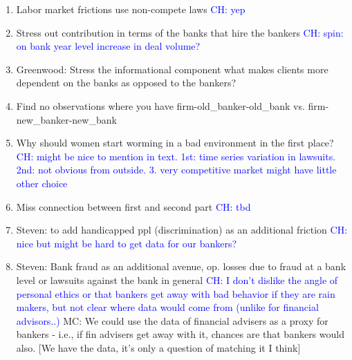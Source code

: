 \begin{enumerate}
	\item Labor market frictions use non-compete laws \textcolor{blue}{CH: yep}
	\item Stress out contribution in terms of the banks that hire the bankers \textcolor{blue}{CH: spin: on bank year level increase in deal volume?}
	\item Greenwood: Stress the informational component what makes clients more dependent on the banks as opposed to the bankers?
	\item Find no observations where you have firm-old\_banker-old\_bank vs. firm-new\_banker-new\_bank 
	\item Why should women start worming in a bad environment in the first place? \textcolor{blue}{CH: might be nice to mention in text. 1st: time series variation in lawsuits. 2nd: not obvious from outside. 3. very competitive market might have little other choice}
	\item Miss connection between first and second part \textcolor{blue}{CH: tbd}
	\item Steven: to add handicapped ppl (discrimination) as an additional friction  \textcolor{blue}{CH: nice but might be hard to get data for our bankers?}
	\item Steven: Bank fraud as an additional avenue, op. losses due to fraud at a bank level or lawsuits against the bank in general \textcolor{blue}{CH: I don't dislike the angle of personal ethics or that bankers get away with bad behavior if they are rain makers, but not clear where data would come from (unlike for financial advisors..)} MC: We could use the data of financial advisers as a proxy for bankers - i.e., if fin advisers get away with it, chances are that bankers would also. [We have the data, it's only a question of matching it I think]

\end{enumerate}



